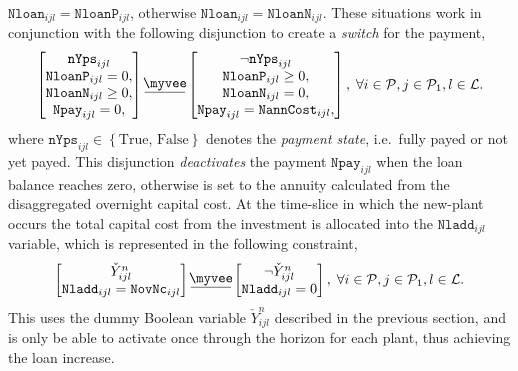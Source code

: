 \documentclass{amsbook}
\newcommand{\myveebar}{\mathbin{\vcenter{\hbox{$ \underline{\mkern-2.4mu{\myvee}\mkern-2.4mu} $}}}}
\begin{document}
$\mathtt{Nloan}_{ijl} = \mathtt{NloanP}_{ijl}$, otherwise 
$\mathtt{Nloan}_{ijl} = \mathtt{NloanN}_{ijl}$. These situations work in
conjunction with the following disjunction to create a \emph{switch} for the
payment,
%
\begin{equation}
    \begin{bmatrix}
        \mathtt{nYps}_{ijl} \\
        \mathtt{NloanP}_{ijl} = 0, \\
        \mathtt{NloanN}_{ijl} \geq 0,\\
        \mathtt{Npay}_{ijl} = 0, \\
    \end{bmatrix}
    \myveebar
    \begin{bmatrix}
        \neg \mathtt{nYps}_{ijl} \\
        \mathtt{NloanP}_{ijl} \geq 0, \\
        \mathtt{NloanN}_{ijl} = 0, \\
        \mathtt{Npay}_{ijl} = \mathtt{NannCost}_{ijl}, \\
    \end{bmatrix}
    , \; \forall i\in \mathcal{P}, j\in \mathcal{P}_1, l\in \mathcal{L}.
\end{equation}
%
where $\mathtt{nYps}_{ijl} \in \left\{\text{True, False}\right\}$ denotes the
\emph{payment state}, i.e.\ fully payed or not yet payed. This disjunction
\emph{deactivates} the payment $\mathtt{Npay}_{ijl}$ when the loan balance
reaches zero, otherwise is set to the annuity calculated from the disaggregated 
overnight capital cost. 
%
At the time-slice in which the new-plant occurs the total capital cost from the
investment is allocated into the $\mathtt{Nladd}_{ijl}$ variable, which is
represented in the following constraint,
%
\begin{equation}
    \begin{bmatrix}
        \check{Y}^n_{ijl} \\
        \mathtt{Nladd}_{ijl} = \mathtt{NovNc}_{ijl}
    \end{bmatrix}
    \myveebar
    \begin{bmatrix}
        \neg \check{Y}^n_{ijl} \\
        \mathtt{Nladd}_{ijl} = 0
    \end{bmatrix}
    , \; \forall i\in \mathcal{P}, j\in \mathcal{P}_1, l\in \mathcal{L}.
\end{equation}
%
This uses the dummy Boolean variable $\check{Y}^n_{ijl}$ described in the
previous section, and is only be able to activate once through the horizon for
each plant, thus achieving the loan increase.
\end{document}
